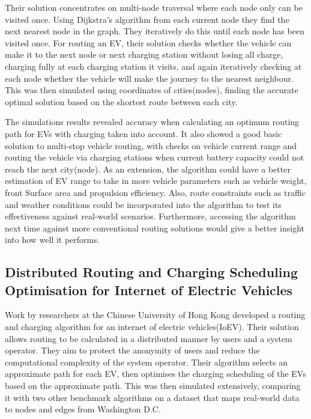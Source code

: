 \documentclass[11pt]{report}
\begin{document}
Their solution concentrates on multi-node traversal where each node only can be visited once. Using Dijkstra's algorithm from each current node they find the next nearest node in the graph. They iteratively do this until each node has been visited once. For routing an EV, their solution checks whether the vehicle can make it to the next node or next charging station without losing all charge, charging fully at each charging station it visits, and again iteratively checking at each node whether the vehicle will make the journey to the nearest neighbour. This was then simulated using coordinates of cities(nodes), finding the accurate optimal solution based on the shortest route between each city.

The simulations results revealed accuracy when calculating an optimum routing path for EVs with charging taken into account. It also showed a good basic solution to multi-stop vehicle routing, with checks on vehicle current range and routing the vehicle via charging stations when current battery capacity could not reach the next city(node). As an extension, the algorithm could have a better estimation of EV range to take in more vehicle parameters such as vehicle weight, front Surface area and propulsion efficiency. Also, route constraints such as traffic and weather conditions could be incorporated into the algorithm to test its effectiveness against real-world scenarios. Furthermore, accessing the algorithm next time against more conventional routing solutions would give a better insight into how well it performs.

\subsection{Distributed Routing and Charging Scheduling Optimisation for Internet of Electric Vehicles  \autocite{distributedRoutingTang}}

Work by researchers at the Chinese University of Hong Kong developed a routing and charging algorithm for an internet of electric vehicles(IoEV). Their solution allows routing to be calculated in a distributed manner by users and a system operator. They aim to protect the anonymity of users and reduce the computational complexity of the system operator. Their algorithm selects an approximate path for each EV, then optimises the charging scheduling of the EVs based on the approximate path. This was then simulated extensively, comparing it with two other benchmark algorithms on a dataset that maps real-world data to nodes and edges from Washington D.C.
\end{document}
